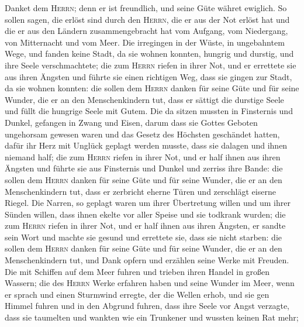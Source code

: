  Danket dem \textsc{Herrn}; denn er ist freundlich, und
seine Güte währet ewiglich.  So sollen sagen, die erlöst
sind durch den \textsc{Herrn}, die er aus der Not erlöst hat
 und die er aus den Ländern zusammengebracht hat vom
Aufgang, vom Niedergang, von Mitternacht und vom Meer. 
Die irregingen in der Wüste, in ungebahntem Wege, und fanden keine
Stadt, da sie wohnen konnten,  hungrig und durstig, und
ihre Seele verschmachtete;  die zum \textsc{Herrn} riefen
in ihrer Not, und er errettete sie aus ihren Ängsten  und
führte sie einen richtigen Weg, dass sie gingen zur Stadt, da sie wohnen
konnten:  die sollen dem \textsc{Herrn} danken für seine
Güte und für seine Wunder, die er an den Menschenkindern tut,
 dass er sättigt die durstige Seele und füllt die hungrige
Seele mit Gutem.  Die da sitzen mussten in Finsternis und
Dunkel, gefangen in Zwang und Eisen,  darum dass sie
Gottes Geboten ungehorsam gewesen waren und das Gesetz des Höchsten
geschändet hatten,  dafür ihr Herz mit Unglück geplagt
werden musste, dass sie dalagen und ihnen niemand half; 
die zum \textsc{Herrn} riefen in ihrer Not, und er half ihnen aus ihren
Ängsten  und führte sie aus Finsternis und Dunkel und
zerriss ihre Bande:  die sollen dem \textsc{Herrn} danken
für seine Güte und für seine Wunder, die er an den Menschenkindern tut,
 dass er zerbricht eherne Türen und zerschlägt eiserne
Riegel.  Die Narren, so geplagt waren um ihrer
Übertretung willen und um ihrer Sünden willen,  dass
ihnen ekelte vor aller Speise und sie todkrank wurden; 
die zum \textsc{Herrn} riefen in ihrer Not, und er half ihnen aus ihren
Ängsten,  er sandte sein Wort und machte sie gesund und
errettete sie, dass sie nicht starben:  die sollen dem
\textsc{Herrn} danken für seine Güte und für seine Wunder, die er an den
Menschenkindern tut,  und Dank opfern und erzählen seine
Werke mit Freuden.  Die mit Schiffen auf dem Meer fuhren
und trieben ihren Handel in großen Wassern;  die des
\textsc{Herrn} Werke erfahren haben und seine Wunder im Meer,
 wenn er sprach und einen Sturmwind erregte, der die
Wellen erhob,  und sie gen Himmel fuhren und in den
Abgrund fuhren, dass ihre Seele vor Angst verzagte,  dass
sie taumelten und wankten wie ein Trunkener und wussten keinen Rat mehr;
